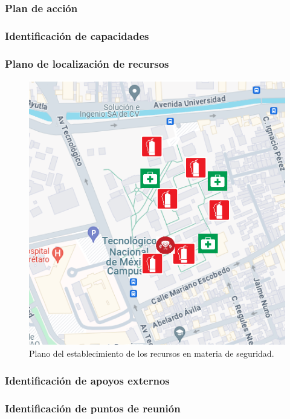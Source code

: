     \subsubsection{Plan de acción}
    
    \subsubsection{Identificación de capacidades}
    
    \subsubsection{Plano de localización de recursos}
    
    \begin{figure}[H]
        \centering
        \includegraphics[scale=0.4]{35/Img/mapaEB.png}
        \caption{Plano del establecimiento de los recursos en materia de seguridad.}
    \end{figure}
    
    \subsubsection{ Identificación de apoyos externos}
    
    \subsubsection{Identificación de puntos de reunión}
    
